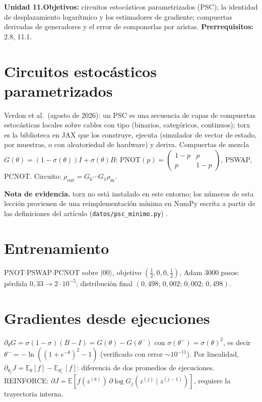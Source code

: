 \documentclass[11pt,a4paper]{article}
\begin{document}

\noindent\textbf{Unidad 11.}\quad\textbf{Objetivos:} circuitos estocásticos parametrizados (PSC); la identidad de desplazamiento logarítmico y los estimadores de
gradiente; compuertas derivadas de generadores y el error de componerlas por aristas.
\textbf{Prerrequisitos:} 2.8, 11.1.

\section{Circuitos estocásticos parametrizados}
Verdon et al.\ (agosto de 2026): un PSC es una secuencia de capas de compuertas estocásticas locales sobre cables con tipo (binarios, categóricos, continuos); torx es la
biblioteca en JAX que los construye, ejecuta (simulador de vector de estado, por muestras, o con aleatoriedad de hardware) y deriva. Compuertas de mezcla
$G(\theta)=(1-\sigma(\theta))I+\sigma(\theta)B$: $\mathrm{PNOT}(p)=\left(\begin{smallmatrix}1-p&p\\p&1-p\end{smallmatrix}\right)$, PSWAP, PCNOT. Circuito:
$\rho_{\text{out}}=G_k\cdots G_1\rho_{\text{in}}$.

\textbf{Nota de evidencia.} torx no está instalado en este entorno; los números de esta lección provienen de una reimplementación mínima en NumPy escrita a partir de
las definiciones del artículo (\texttt{datos/psc\_minimo.py}) \evS.

\section{Entrenamiento}
PNOT$\cdot$PSWAP$\cdot$PCNOT sobre $|00\rangle$, objetivo $(\tfrac12,0,0,\tfrac12)$, Adam 3000 pasos: pérdida $0{,}33\to2\cdot10^{-5}$; distribución final
$(0{,}498;\,0{,}002;\,0{,}002;\,0{,}498)$.

\section{Gradientes desde ejecuciones}
$\partial_\theta G=\sigma(1-\sigma)(B-I)=G(\theta)-G(\theta^-)$ con $\sigma(\theta^-)=\sigma(\theta)^2$, es decir $\theta^-=-\ln((1+e^{-\theta})^2-1)$ (verificado con error
$\sim10^{-11}$). Por linealidad, $\partial_{\theta_j}J=\mathbb E_{\theta}[f]-\mathbb E_{\theta_j^-}[f]$: diferencia de dos promedios de ejecuciones. REINFORCE:
$\partial J=\mathbb E[f(z^{(k)})\,\partial\log G_j(z^{(j)}\mid z^{(j-1)})]$, requiere la trayectoria interna.
\end{document}

